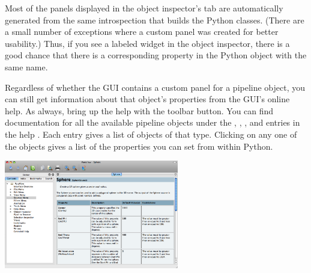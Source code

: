 Most of the panels displayed in the object inspector's  tab
are automatically generated from the same introspection that builds the
Python classes. (There are a small number of exceptions where a custom
panel was created for better usability.) Thus, if you see a labeled widget
in the object inspector, there is a good chance that there is a
corresponding property in the Python object with the same name.

Regardless of whether the GUI contains a custom panel for a pipeline
object, you can still get information about that object's properties from
the GUI's online help.  As always, bring up the help with the
 toolbar button.  You can find documentation for all the
available pipeline objects under the , , , and  entries in the help
.  Each entry gives a list of objects of that type.  Clicking
on any one of the objects gives a list of the properties you can set from
within Python.

\begin{inlinefig}
  \includegraphics[width=3in]{images/ObjectHelp}
\end{inlinefig}


